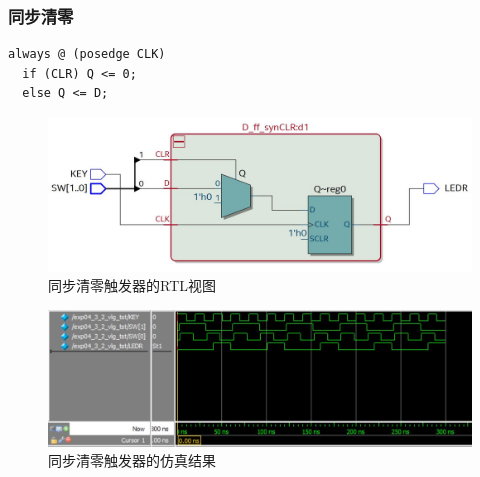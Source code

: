 \documentclass[12pt,a4paper,UTF8]{article}
\begin{document}
\subsubsection{同步清零}
\begin{lstlisting}[style=verilog-style]
always @ (posedge CLK)
  if (CLR) Q <= 0;
  else Q <= D;
\end{lstlisting}
\begin{figure}[H]
  \centering
  \includegraphics[width=1\textwidth]{rtl_synCLR.JPG}
  \caption{同步清零触发器的RTL视图}
  \label{rtl_synCLR}
\end{figure}
\begin{figure}[H]
  \centering
  \includegraphics[width=1\textwidth]{sim_synCLR.JPG}
  \caption{同步清零触发器的仿真结果}
  \label{sim_synCLR}
\end{figure}
\hspace*{\fill}\\
\end{document}
